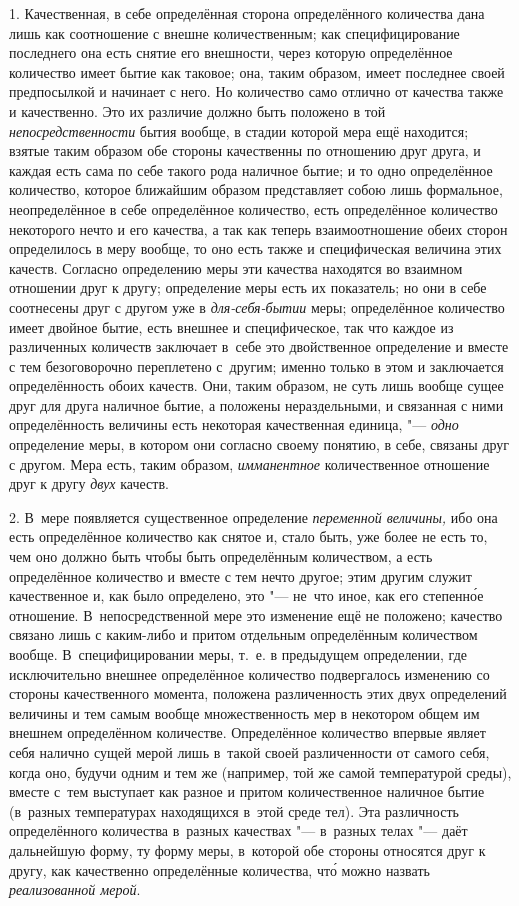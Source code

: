 1. Качественная, в себе определённая сторона определённого количества дана лишь
как соотношение с внешне количественным; как специфицирование последнего она
есть снятие его внешности, через которую определённое количество имеет бытие
как таковое; она, таким образом, имеет последнее своей предпосылкой и начинает
с него. Но количество само отлично от качества также и качественно. Это их
различие должно быть положено в той {\em непосредственности} бытия вообще, в
стадии которой мера ещё находится; взятые таким образом обе стороны качественны
по отношению друг друга, и каждая есть сама по себе такого рода наличное бытие;
и то одно определённое количество, которое ближайшим образом представляет собою
лишь формальное, неопределённое в себе определённое количество, есть
определённое количество некоторого нечто и его качества, а так как теперь
взаимоотношение обеих сторон определилось в меру вообще, то оно есть также и
специфическая величина этих качеств. Согласно определению меры эти качества
находятся во взаимном отношении друг к другу; определение меры есть их
показатель; но они в себе соотнесены друг с другом уже в {\em для-себя-бытии}
меры; определённое количество имеет двойное бытие, есть внешнее и
специфическое, так что каждое из различенных количеств заключает в~себе это
двойственное определение и вместе с тем безоговорочно переплетено с~другим;
именно только в этом и заключается определённость обоих качеств. Они, таким
образом, не суть лишь вообще сущее друг для друга наличное бытие, а положены
нераздельными, и связанная с ними определённость величины есть некоторая
качественная единица, "--- {\em одно} определение меры, в котором они согласно
своему понятию, в себе, связаны друг с другом. Мера есть, таким образом,
{\em имманентное} количественное отношение друг к другу {\em двух} качеств.

2. В~мере появляется существенное определение {\em переменной величины,} ибо
она есть определённое количество как снятое и, стало быть, уже более не есть
то, чем оно должно быть чтобы быть определённым количеством, а есть
определённое количество и вместе с тем нечто другое; этим другим служит
качественное и, как было определено, это "--- не~что иное, как его
степенн\'{о}е отношение. В~непосредственной мере это изменение ещё не положено;
качество связано лишь с каким-либо и притом отдельным определённым количеством
вообще. В~специфицировании меры, т.~е. в предыдущем определении, где
исключительно внешнее определённое количество подвергалось изменению со стороны
качественного момента, положена различенность этих двух определений величины и
тем самым вообще множественность мер в некотором общем им внешнем определённом
количестве. Определённое количество впервые являет себя налично сущей мерой
лишь в~такой своей различенности от самого себя, когда оно, будучи одним и тем
же (например, той же самой температурой среды), вместе с~тем выступает как
разное и притом количественное наличное бытие (в~разных температурах
находящихся в~этой среде тел). Эта различность определённого количества
в~разных качествах "--- в~разных телах "--- даёт дальнейшую форму, ту форму
меры, в~которой обе стороны относятся друг к другу, как качественно
определённые количества, чт\'{о} можно назвать {\em реализованной мерой}.

